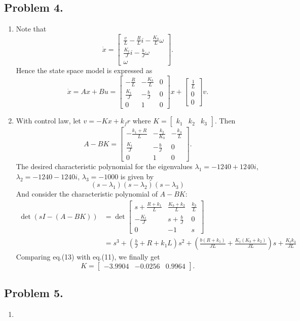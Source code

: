 \documentclass{article}
\begin{document}
\subsection*{Problem 4.}
    \begin{enumerate}
    \item
    Note that
    $$ \dot{x} = \left[ \begin{matrix}
    \frac{v}{L} - \frac{R}{L}i - \frac{K_b}{L}\omega \\
    \frac{K_t}{J}i - \frac{b}{J}\omega \\
    \omega
    \end{matrix} \right]. $$
    Hence the state space model is expressed as
    $$ \dot{x} = Ax+Bu = \left[ \begin{matrix}
    -\frac{R}{L} & -\frac{K_b}{L} & 0 \\
    \frac{K_t}{J} & -\frac{b}{J} & 0 \\
    0 & 1 & 0
    \end{matrix} \right]
    x + \left[ \begin{matrix}
    \frac{1}{L} \\
    0 \\
    0
    \end{matrix} \right]
    v. $$
    
    \item
    With control law, let $v = -Kx+k_fr$ where $K = \left[ \begin{matrix}
    k_1 & k_2 & k_3
    \end{matrix} \right].$
    Then
    $$ A-BK = \left[ \begin{matrix}
    -\frac{k_1+R}{L} & -\frac{k_2}{K_b} & -\frac{k_3}{L} \\
    \frac{K_t}{J} & -\frac{b}{J} & 0 \\
    0 & 1 & 0
    \end{matrix} \right]. $$
    The desired characteristic polynomial for the eigenvalues $\lambda_1 = -1240+1240i$, $\lambda_2 = -1240-1240i$, $\lambda_3 = -1000$ is given by
    \begin{equation}
    (s-\lambda_1)(s-\lambda_2)(s-\lambda_3) 
    \end{equation}
    And consider the characteristic polynomial of $A-BK$:
    \begin{align}
    \det(sI-(A-BK)) &= \det \left[ \begin{matrix}
    s+\frac{R+k_1}{L} & \frac{K_b+k_2}{L} & \frac{k_3}{L} \\
    -\frac{K_t}{J} & s+\frac{b}{J} & 0 \\
    0 & -1 & s
    \end{matrix} \right] \\
    &= s^3+(\frac{b}{J}+{R+k_1}{L})s^2+(\frac{b(R+k_1)}{JL}+\frac{K_t(K_b+k_2)}{JL})s+\frac{K_tk_3}{JL}
    \end{align}
    Comparing eq.(13) with eq.(11), we finally get
    $$ K = \left[ \begin{matrix}
    -3.9904 & -0.0256 & 0.9964
    \end{matrix} \right]. $$
    
    \end{enumerate}
    
\subsection*{Problem 5.}
    \begin{enumerate}
    \item
    
    
    \end{enumerate}
\end{document}
